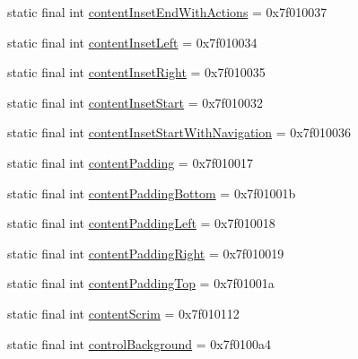 \begin{CompactItemize}
static final int \hyperlink{classandroid_1_1support_1_1graphics_1_1drawable_1_1animated_1_1_r_1_1attr_48dfa16ec4f3417833240f51ba8551bb}{contentInsetEndWithActions} = 0x7f010037
\item 
static final int \hyperlink{classandroid_1_1support_1_1graphics_1_1drawable_1_1animated_1_1_r_1_1attr_66b3970bc0c6b4a4e581de7984394271}{contentInsetLeft} = 0x7f010034
\item 
static final int \hyperlink{classandroid_1_1support_1_1graphics_1_1drawable_1_1animated_1_1_r_1_1attr_de6f57453c5b0b5a01447c3c5e0e35ba}{contentInsetRight} = 0x7f010035
\item 
static final int \hyperlink{classandroid_1_1support_1_1graphics_1_1drawable_1_1animated_1_1_r_1_1attr_425b5c0229212a35038a4fc3f05e0a80}{contentInsetStart} = 0x7f010032
\item 
static final int \hyperlink{classandroid_1_1support_1_1graphics_1_1drawable_1_1animated_1_1_r_1_1attr_417f8a89ff1665bb20318a7408b0bc35}{contentInsetStartWithNavigation} = 0x7f010036
\item 
static final int \hyperlink{classandroid_1_1support_1_1graphics_1_1drawable_1_1animated_1_1_r_1_1attr_5e0911a417853ff46f0554281cc69fe1}{contentPadding} = 0x7f010017
\item 
static final int \hyperlink{classandroid_1_1support_1_1graphics_1_1drawable_1_1animated_1_1_r_1_1attr_d487613ecb2986727baacf6b69308ef8}{contentPaddingBottom} = 0x7f01001b
\item 
static final int \hyperlink{classandroid_1_1support_1_1graphics_1_1drawable_1_1animated_1_1_r_1_1attr_2a44c542de0dfa0a169d3d8caa1a7511}{contentPaddingLeft} = 0x7f010018
\item 
static final int \hyperlink{classandroid_1_1support_1_1graphics_1_1drawable_1_1animated_1_1_r_1_1attr_1586bcc3945f4257beb75ca6cb28fe25}{contentPaddingRight} = 0x7f010019
\item 
static final int \hyperlink{classandroid_1_1support_1_1graphics_1_1drawable_1_1animated_1_1_r_1_1attr_1801e545953e523748b9413fd415f5b0}{contentPaddingTop} = 0x7f01001a
\item 
static final int \hyperlink{classandroid_1_1support_1_1graphics_1_1drawable_1_1animated_1_1_r_1_1attr_9c51522920fc3e41b06595ca9b671505}{contentScrim} = 0x7f010112
\item 
static final int \hyperlink{classandroid_1_1support_1_1graphics_1_1drawable_1_1animated_1_1_r_1_1attr_6a12f9299c8d1380c795dda0df1b0839}{controlBackground} = 0x7f0100a4
\item 

\end{CompactItemize}
